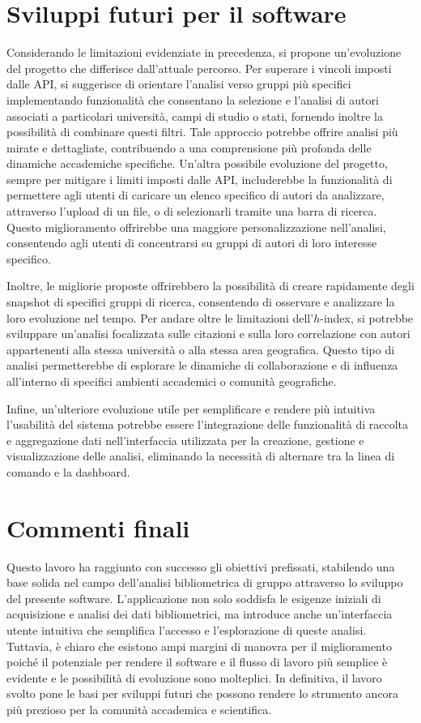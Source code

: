 \section{Sviluppi futuri per il software}
Considerando le limitazioni evidenziate in precedenza, si propone un'evoluzione del progetto che differisce dall'attuale percorso. Per superare i vincoli imposti dalle API, si suggerisce di orientare l'analisi verso gruppi più specifici implementando funzionalità che consentano la selezione e l'analisi di autori associati a particolari università, campi di studio o stati, fornendo inoltre la possibilità di combinare questi filtri. Tale approccio potrebbe offrire analisi più mirate e dettagliate, contribuendo a una comprensione più profonda delle dinamiche accademiche specifiche.
Un'altra possibile evoluzione del progetto, sempre per mitigare i limiti imposti dalle API, includerebbe la funzionalità di permettere agli utenti di caricare un elenco specifico di autori da analizzare, attraverso l'upload di un file, o di selezionarli tramite una barra di ricerca. Questo miglioramento offrirebbe una maggiore personalizzazione nell'analisi, consentendo agli utenti di concentrarsi su gruppi di autori di loro interesse specifico.

Inoltre, le migliorie proposte offrirebbero la possibilità di creare rapidamente degli snapshot di specifici gruppi di ricerca, consentendo di osservare e analizzare la loro evoluzione nel tempo.
Per andare oltre le limitazioni dell'$h$-index, si potrebbe sviluppare un'analisi focalizzata sulle citazioni e sulla loro correlazione con autori appartenenti alla stessa università o alla stessa area geografica. Questo tipo di analisi permetterebbe di esplorare le dinamiche di collaborazione e di influenza all'interno di specifici ambienti accademici o comunità geografiche.

Infine, un'ulteriore evoluzione utile per semplificare e rendere più intuitiva l'usabilità del sistema potrebbe essere l'integrazione delle funzionalità di raccolta e aggregazione dati nell'interfaccia utilizzata per la creazione, gestione e visualizzazione delle analisi, eliminando la necessità di alternare tra la linea di comando e la dashboard.

\section{Commenti finali}
Questo lavoro ha raggiunto con successo gli obiettivi prefissati, stabilendo una base solida nel campo dell'analisi bibliometrica di gruppo attraverso lo sviluppo del presente software. L'applicazione non solo soddisfa le esigenze iniziali di acquisizione e analisi dei dati bibliometrici, ma introduce anche un'interfaccia utente intuitiva che semplifica l'accesso e l'esplorazione di queste analisi. Tuttavia, è chiaro che esistono ampi margini di manovra per il miglioramento poiché il potenziale per rendere il software e il flusso di lavoro più semplice è evidente e le possibilità di evoluzione sono molteplici. In definitiva, il lavoro svolto pone le basi per sviluppi futuri che possono rendere lo strumento ancora più prezioso per la comunità accademica e scientifica.